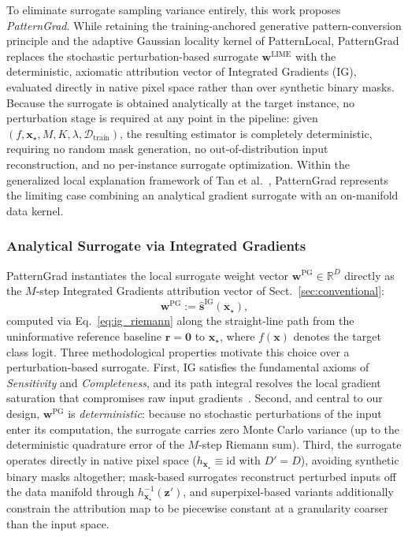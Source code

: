 \documentclass[pdflatex,sn-mathphys-num]{sn-jnl}
\theoremstyle{thmstyleone}
\theoremstyle{thmstyletwo}%
\theoremstyle{thmstylethree}%
\begin{document}
To eliminate surrogate sampling variance entirely, this work proposes \emph{PatternGrad}. While retaining the training-anchored generative pattern-conversion principle and the adaptive Gaussian locality kernel of PatternLocal, PatternGrad replaces the stochastic perturbation-based surrogate $\mathbf{w}^{\text{LIME}}$ with the deterministic, axiomatic attribution vector of Integrated Gradients (IG), evaluated directly in native pixel space rather than over synthetic binary masks. Because the surrogate is obtained analytically at the target instance, no perturbation stage is required at any point in the pipeline: given $(f, \mathbf{x}_\star, M, K, \lambda, \mathcal{D}_{\text{train}})$, the resulting estimator is completely deterministic, requiring no random mask generation, no out-of-distribution input reconstruction, and no per-instance surrogate optimization. Within the generalized local explanation framework of Tan et al.~\cite{tan2023}, PatternGrad represents the limiting case combining an analytical gradient surrogate with an on-manifold data kernel.

\subsubsection{Analytical Surrogate via Integrated Gradients}\label{sec:pg_surrogate}
PatternGrad instantiates the local surrogate weight vector $\mathbf{w}^{\text{PG}} \in \mathbb{R}^D$ directly as the $M$-step Integrated Gradients attribution vector of Sect.~\ref{sec:conventional}:
\begin{equation}
    \mathbf{w}^{\text{PG}} \mathrel{:=} \hat{\mathbf{s}}^{\text{IG}}(\mathbf{x}_\star),
    \label{eq:pg_surrogate}
\end{equation}
computed via Eq.~\eqref{eq:ig_riemann} along the straight-line path from the uninformative reference baseline $\mathbf{r} = \mathbf{0}$ to $\mathbf{x}_\star$, where $f(\mathbf{x})$ denotes the target class logit. Three methodological properties motivate this choice over a perturbation-based surrogate. First, IG satisfies the fundamental axioms of \emph{Sensitivity} and \emph{Completeness}, and its path integral resolves the local gradient saturation that compromises raw input gradients~\cite{sundararajan2017}. Second, and central to our design, $\mathbf{w}^{\text{PG}}$ is \emph{deterministic}: because no stochastic perturbations of the input enter its computation, the surrogate carries zero Monte Carlo variance (up to the deterministic quadrature error of the $M$-step Riemann sum). Third, the surrogate operates directly in native pixel space ($h_{\mathbf{x}_\star} \equiv \mathrm{id}$ with $D' = D$), avoiding synthetic binary masks altogether; mask-based surrogates reconstruct perturbed inputs off the data manifold through $h_{\mathbf{x}_\star}^{-1}(\mathbf{z}')$, and superpixel-based variants additionally constrain the attribution map to be piecewise constant at a granularity coarser than the input space.
\end{document}
